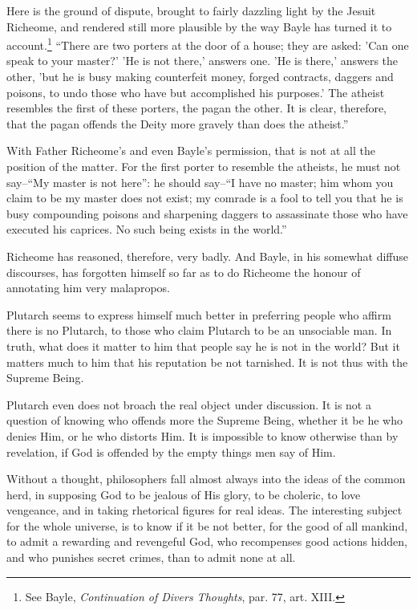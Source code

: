 Here is the ground of dispute, brought to fairly dazzling light by the
Jesuit Richeome, and rendered still more plausible by the way Bayle has
turned it to account.\footnote{See Bayle, \textit{Continuation of Divers Thoughts}, par. 77, art. XIII.}
\enquote{There are two porters at the door of a house; they are asked: 'Can one
speak to your master?' 'He is not there,' answers one. 'He is there,'
answers the other, 'but he is busy making counterfeit money, forged
contracts, daggers and poisons, to undo those who have but accomplished
his purposes.' The atheist resembles the first of these porters, the
pagan the other. It is clear, therefore, that the pagan offends the
Deity more gravely than does the atheist.}

With Father Richeome's and even Bayle's permission, that is not at all
the position of the matter. For the first porter to resemble the
atheists, he must not say--\enquote{My master is not here}: he should say--\enquote{I
have no master; him whom you claim to be my master does not exist; my
comrade is a fool to tell you that he is busy compounding poisons and
sharpening daggers to assassinate those who have executed his caprices.
No such being exists in the world.}

Richeome has reasoned, therefore, very badly. And Bayle, in his somewhat
diffuse discourses, has forgotten himself so far as to do Richeome the
honour of annotating him very malapropos.

Plutarch seems to express himself much better in preferring people who
affirm there is no Plutarch, to those who claim Plutarch to be an
unsociable man. In truth, what does it matter to him that people say he
is not in the world? But it matters much to him that his reputation be
not tarnished. It is not thus with the Supreme Being.

Plutarch even does not broach the real object under discussion. It is
not a question of knowing who offends more the Supreme Being, whether it
be he who denies Him, or he who distorts Him. It is impossible to know
otherwise than by revelation, if God is offended by the empty things men
say of Him.

Without a thought, philosophers fall almost always into the ideas of the
common herd, in supposing God to be jealous of His glory, to be
choleric, to love vengeance, and in taking rhetorical figures for real
ideas. The interesting subject for the whole universe, is to know if it
be not better, for the good of all mankind, to admit a rewarding and
revengeful God, who recompenses good actions hidden, and who punishes
secret crimes, than to admit none at all.

